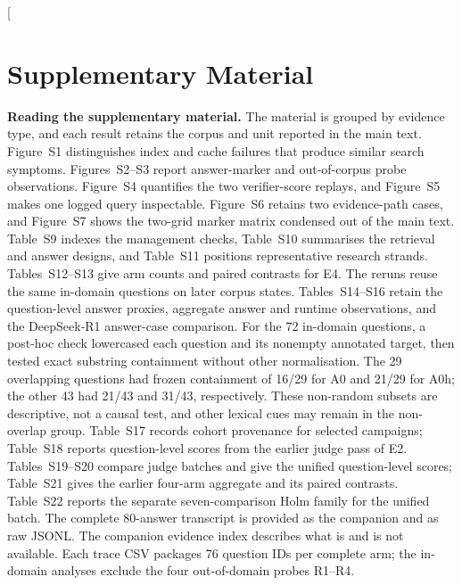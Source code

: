 \documentclass[final,5p,times,twocolumn]{elsarticle}
\begin{document}
\setcounter{figure}{0}\setcounter{table}{8}
\twocolumn[{%
\begin{minipage}{\textwidth}
{\centering
\section*{Supplementary Material}
}

\noindent\textbf{Reading the supplementary material.} The material is
grouped by evidence type, and each result retains the corpus and unit
reported in the main text. Figure~S1 distinguishes index and cache failures
that produce similar search symptoms. Figures~S2--S3 report answer-marker and out-of-corpus probe
observations. Figure~S4 quantifies the two verifier-score replays, and Figure~S5
makes one logged query inspectable. Figure~S6 retains two evidence-path cases,
and Figure~S7 shows the two-grid marker matrix condensed out of the main text.
Table~S9 indexes the management checks, Table~S10 summarises
the retrieval and answer designs, and Table~S11 positions representative
research strands. Tables~S12--S13 give arm counts and paired contrasts for
E4. The reruns reuse the same in-domain questions on later corpus states.
Tables~S14--S16 retain the
question-level answer proxies, aggregate answer and runtime observations,
and the DeepSeek-R1 answer-case comparison. For the 72 in-domain questions,
a post-hoc check lowercased each question and its nonempty annotated target,
then tested exact substring containment without other normalisation. The
29 overlapping questions had frozen containment of 16/29 for A0 and 21/29
for A0h; the other 43 had 21/43 and 31/43, respectively. These non-random
subsets are descriptive, not a causal test, and other lexical cues may remain
in the non-overlap group. Table~S17 records cohort provenance for selected campaigns; Table~S18 reports question-level scores from the
earlier judge pass of E2. Tables~S19--S20 compare judge batches and give the
unified question-level scores; Table~S21 gives the earlier four-arm aggregate
and its paired contrasts. Table~S22 reports the separate seven-comparison
Holm family for the unified batch. The complete 80-answer transcript is
provided as the companion  and as raw JSONL.
The companion evidence index describes what is and is not available. Each
trace CSV packages 76 question IDs per complete arm; the in-domain analyses
exclude the four out-of-domain probes R1--R4.


\end{minipage}}
\end{document}
